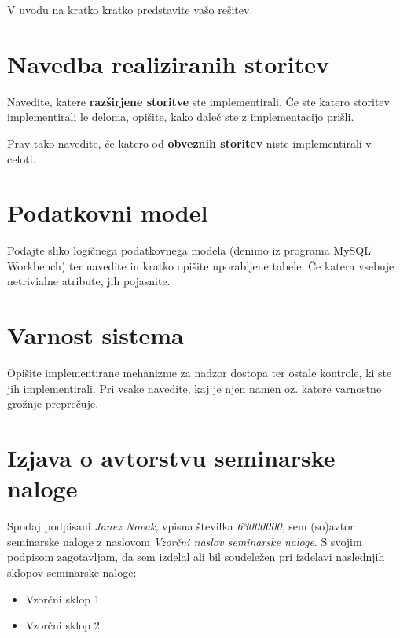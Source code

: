 \documentclass[a4paper,12pt]{report}
\newcommand{\naslov}     {Vzorčni naslov seminarske naloge}
\newcommand{\prviavtor}  {Janez Novak}
\newcommand{\prviindeks} {63000000}
\begin{document}
V uvodu na kratko kratko predstavite vašo rešitev.


\chapter{Navedba realiziranih storitev}

Navedite, katere \textbf{razširjene storitve} ste implementirali. Če ste katero storitev implementirali le deloma, opišite, kako daleč ste z implementacijo prišli. 

Prav tako navedite, če katero od \textbf{obveznih storitev} niste implementirali v celoti.


\chapter{Podatkovni model}

Podajte sliko logičnega podatkovnega modela (denimo iz programa MySQL Workbench) ter navedite in kratko opišite uporabljene tabele. Če katera vsebuje netrivialne atribute, jih pojasnite.

\chapter{Varnost sistema}

Opišite implementirane mehanizme za nadzor dostopa ter ostale kontrole, ki ste jih implementirali. Pri vsake navedite, kaj je njen namen oz. katere varnostne grožnje preprečuje.

\chapter{Izjava o avtorstvu seminarske naloge}

Spodaj podpisani \textit{\prviavtor}, vpisna številka \textit{\prviindeks}, sem (so)avtor seminarske naloge z naslovom \textit{\naslov}. S svojim podpisom zagotavljam, da sem izdelal ali bil soudeležen pri izdelavi naslednjih sklopov seminarske naloge:
\begin{itemize}
    \item Vzorčni sklop 1
	 \item Vzorčni sklop 2
\end{itemize}
\end{document}
